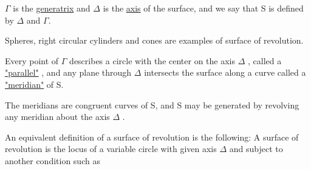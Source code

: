 \documentclass[11pt]{article}
\begin{document}
$\Gamma$ is the \underline{generatrix} and $\Delta$ is the \underline{axis} of the surface, and we say that S is defined by $\Delta$ and  $\Gamma$.  

Spheres, right circular cylinders and cones are examples of surface of revolution.

Every point of $\Gamma$ describes a circle with the center on the axis $\Delta$ , called a \underline{"parallel"} , and any plane through $\Delta$ intersects the surface along a curve called a \underline{"meridian"} of S.

The meridians are congruent curves of S, and S may be generated by revolving any meridian about the axis $\Delta$ .

An equivalent definition of a surface of revolution is the following: A surface of revolution is the locus of a variable circle with given axis $\Delta$ and subject to another condition such as
\end{document}
